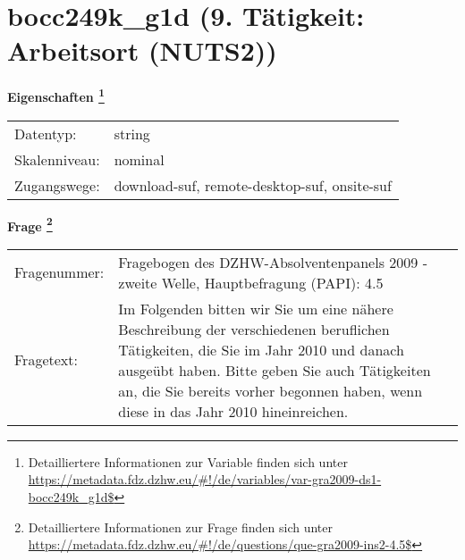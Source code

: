 
    \setcounter{footnote}{0}

    \vspace*{-1.8cm}
	\section{bocc249k\_g1d (9. Tätigkeit: Arbeitsort (NUTS2))}
	\label{section:bocc249k_g1d}



    \vspace*{0.5cm}
    \noindent\textbf{Eigenschaften
	\footnote{Detailliertere Informationen zur Variable finden sich unter
		\url{https://metadata.fdz.dzhw.eu/\#!/de/variables/var-gra2009-ds1-bocc249k_g1d$}}}\\
	\begin{tabularx}{\hsize}{@{}lX}
	Datentyp: & string \\
	Skalenniveau: & nominal \\
	Zugangswege: &
	  download-suf, 
	  remote-desktop-suf, 
	  onsite-suf
 \\
    \end{tabularx}



				\vspace*{0.5cm}
                \noindent\textbf{Frage
	                \footnote{Detailliertere Informationen zur Frage finden sich unter
		              \url{https://metadata.fdz.dzhw.eu/\#!/de/questions/que-gra2009-ins2-4.5$}}}\\
				\begin{tabularx}{\hsize}{@{}lX}
					Fragenummer: &
					  Fragebogen des DZHW-Absolventenpanels 2009 - zweite Welle, Hauptbefragung (PAPI):
					  4.5
 \\
					Fragetext: & Im Folgenden bitten wir Sie um eine nähere Beschreibung der verschiedenen beruflichen Tätigkeiten, die Sie im Jahr 2010 und danach ausgeübt haben. Bitte geben Sie auch Tätigkeiten an, die Sie bereits vorher begonnen haben, wenn diese in das Jahr 2010 hineinreichen. \\
				\end{tabularx}





